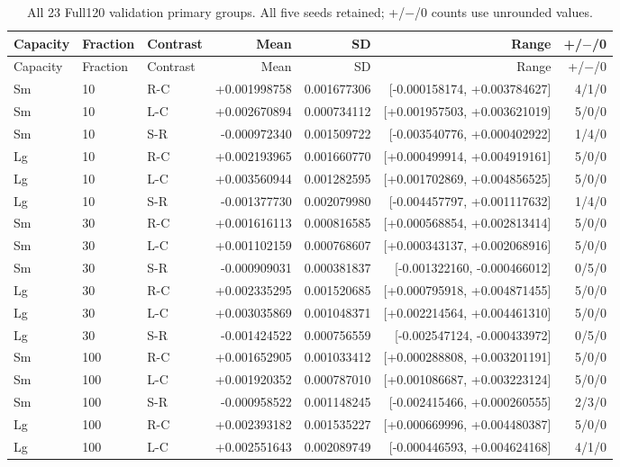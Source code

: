 \begin{longtable}{lllrrrr}
\caption{All 23 Full120 validation primary groups. All five seeds retained; +/$-$/0 counts use unrounded values.}\label{tab:full-primary-complete}\\
\toprule
Capacity & Fraction & Contrast & Mean & SD & Range & +/$-$/0 \\
\midrule\endfirsthead
\toprule
Capacity & Fraction & Contrast & Mean & SD & Range & +/$-$/0 \\
\midrule\endhead
\bottomrule\endfoot
Sm & 10 & R-C & +0.001998758 & 0.001677306 & [-0.000158174, +0.003784627] & 4/1/0 \\
Sm & 10 & L-C & +0.002670894 & 0.000734112 & [+0.001957503, +0.003621019] & 5/0/0 \\
Sm & 10 & S-R & -0.000972340 & 0.001509722 & [-0.003540776, +0.000402922] & 1/4/0 \\
Lg & 10 & R-C & +0.002193965 & 0.001660770 & [+0.000499914, +0.004919161] & 5/0/0 \\
Lg & 10 & L-C & +0.003560944 & 0.001282595 & [+0.001702869, +0.004856525] & 5/0/0 \\
Lg & 10 & S-R & -0.001377730 & 0.002079980 & [-0.004457797, +0.001117632] & 1/4/0 \\
Sm & 30 & R-C & +0.001616113 & 0.000816585 & [+0.000568854, +0.002813414] & 5/0/0 \\
Sm & 30 & L-C & +0.001102159 & 0.000768607 & [+0.000343137, +0.002068916] & 5/0/0 \\
Sm & 30 & S-R & -0.000909031 & 0.000381837 & [-0.001322160, -0.000466012] & 0/5/0 \\
Lg & 30 & R-C & +0.002335295 & 0.001520685 & [+0.000795918, +0.004871455] & 5/0/0 \\
Lg & 30 & L-C & +0.003035869 & 0.001048371 & [+0.002214564, +0.004461310] & 5/0/0 \\
Lg & 30 & S-R & -0.001424522 & 0.000756559 & [-0.002547124, -0.000433972] & 0/5/0 \\
Sm & 100 & R-C & +0.001652905 & 0.001033412 & [+0.000288808, +0.003201191] & 5/0/0 \\
Sm & 100 & L-C & +0.001920352 & 0.000787010 & [+0.001086687, +0.003223124] & 5/0/0 \\
Sm & 100 & S-R & -0.000958522 & 0.001148245 & [-0.002415466, +0.000260555] & 2/3/0 \\
Lg & 100 & R-C & +0.002393182 & 0.001535227 & [+0.000669996, +0.004480387] & 5/0/0 \\
Lg & 100 & L-C & +0.002551643 & 0.002089749 & [-0.000446593, +0.004624168] & 4/1/0 \\

\end{longtable}
